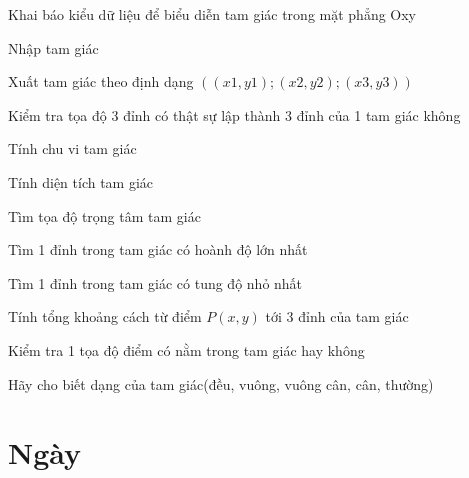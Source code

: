 \begin{problem}
    Khai báo kiểu dữ liệu để biểu diễn tam giác trong mặt phẳng Oxy
\end{problem}
\begin{problem}
    Nhập tam giác
\end{problem}
\begin{problem}
    Xuất tam giác theo định dạng $((x1, y1); (x2, y2); (x3, y3))$
\end{problem}
\begin{problem}
    Kiểm tra tọa độ 3 đỉnh có thật sự lập thành 3 đỉnh của 1 tam giác không
\end{problem}
\begin{problem}
    Tính chu vi tam giác
\end{problem}
\begin{problem}
    Tính diện tích tam giác
\end{problem}
\begin{problem}
    Tìm tọa độ trọng tâm tam giác
\end{problem}
\begin{problem}
    Tìm 1 đỉnh trong tam giác có hoành độ lớn nhất
\end{problem}
\begin{problem}
    Tìm 1 đỉnh trong tam giác có tung độ nhỏ nhất
\end{problem}
\begin{problem}
    Tính tổng khoảng cách từ điểm $P(x, y)$ tới 3 đỉnh của tam giác
\end{problem}
\begin{problem}
    Kiểm tra 1 tọa độ điểm có nằm trong tam giác hay không
\end{problem}
\begin{problem}
    Hãy cho biết dạng của tam giác(đều, vuông, vuông cân, cân, thường)
\end{problem}

\section{Ngày}

